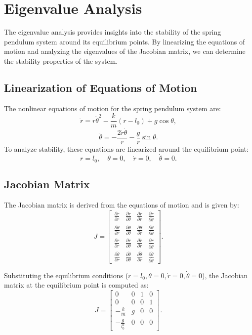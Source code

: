 \documentclass[12pt]{article}
\begin{document}
\section{Eigenvalue Analysis}

The eigenvalue analysis provides insights into the stability of the spring pendulum system around its equilibrium points. By linearizing the equations of motion and analyzing the eigenvalues of the Jacobian matrix, we can determine the stability properties of the system.

\subsection{Linearization of Equations of Motion}
The nonlinear equations of motion for the spring pendulum system are:
\[
\ddot{r} = r \dot{\theta}^2 - \frac{k}{m}(r - l_0) + g \cos\theta,
\]
\[
\ddot{\theta} = -\frac{2 \dot{r} \dot{\theta}}{r} - \frac{g}{r} \sin\theta.
\]
To analyze stability, these equations are linearized around the equilibrium point:
\[
r = l_0, \quad \theta = 0, \quad \dot{r} = 0, \quad \dot{\theta} = 0.
\]

\subsection{Jacobian Matrix}
The Jacobian matrix is derived from the equations of motion and is given by:
\[
J = 
\begin{bmatrix}
\frac{\partial \dot{r}}{\partial r} & \frac{\partial \dot{r}}{\partial \theta} & \frac{\partial \dot{r}}{\partial \dot{r}} & \frac{\partial \dot{r}}{\partial \dot{\theta}} \\
\frac{\partial \dot{\theta}}{\partial r} & \frac{\partial \dot{\theta}}{\partial \theta} & \frac{\partial \dot{\theta}}{\partial \dot{r}} & \frac{\partial \dot{\theta}}{\partial \dot{\theta}} \\
\frac{\partial \ddot{r}}{\partial r} & \frac{\partial \ddot{r}}{\partial \theta} & \frac{\partial \ddot{r}}{\partial \dot{r}} & \frac{\partial \ddot{r}}{\partial \dot{\theta}} \\
\frac{\partial \ddot{\theta}}{\partial r} & \frac{\partial \ddot{\theta}}{\partial \theta} & \frac{\partial \ddot{\theta}}{\partial \dot{r}} & \frac{\partial \ddot{\theta}}{\partial \dot{\theta}}
\end{bmatrix}.
\]

Substituting the equilibrium conditions (\( r = l_0, \theta = 0, \dot{r} = 0, \dot{\theta} = 0 \)), the Jacobian matrix at the equilibrium point is computed as:
\[
J =
\begin{bmatrix}
0 & 0 & 1 & 0 \\
0 & 0 & 0 & 1 \\
-\frac{k}{m} & g & 0 & 0 \\
-\frac{g}{l_0^2} & 0 & 0 & 0
\end{bmatrix}.
\]
\end{document}
